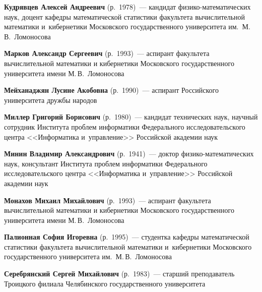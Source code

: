 \begin{multicols}{2}
\vspace*{3pt}

\noindent
\textbf{Кудрявцев Алексей Андреевич} (р.\ 1978)~---
кандидат фи\-зи\-ко-ма\-те\-ма\-ти\-че\-ских наук, доцент кафедры математической 
статистики факультета вычислительной математики и~кибернетики Московского 
государственного университета им.\ М.\,В.~Ломоносова

\vspace*{3pt}

\noindent
\textbf{Марков Александр Сергеевич} (р.\ 1993)~---
 аспирант факультета вычислительной математики и кибернетики Московского 
 государственного университета имени М.\,В.~Ломоносова

\columnbreak

\noindent
\textbf{Мейханаджян Лусине Акобовна} (р.\ 1990)~---
 аспирант Российского университета дружбы народов


\vspace*{3pt}

\noindent
\textbf{Миллер Григорий Борисович} (р.\ 1980)~---
кандидат технических наук, научный сотрудник Института проб\-лем 
информатики Федерального исследовательского центра 
<<Информатика и~управ\-ле\-ние>> Российской академии наук

\vspace*{3pt}



\noindent
\textbf{Минин Владимир Александрович} (р.\ 1941)~---
 доктор фи\-зи\-ко-ма\-тематических наук, 
 консультант Института проб\-лем информатики Федерального исследовательского центра 
 <<Информатика и~управ\-ление>> Российской академии наук
 
 \vspace*{3pt}


\noindent
\textbf{Монахов Михаил Михайлович} (р.\ 1993)~---
аспирант факультета вычислительной математики и кибернетики Московского 
государственного университета имени М.\,В.~Ломоносова

\vspace*{3pt}

\noindent
\textbf{Палионная София Игоревна} (р.\ 1995)~---
студентка кафедры математической статистики факультета вычислительной математики 
и~кибернетики Московского государственного университета им.\ М.\,В.~Ломоносова

\vspace*{3pt}

  \noindent
\textbf{Серебрянский Сергей Михайлович} (р.\ 1983)~---
старший преподаватель Троицкого филиала Челябинского государственного университета


\end{multicols}
